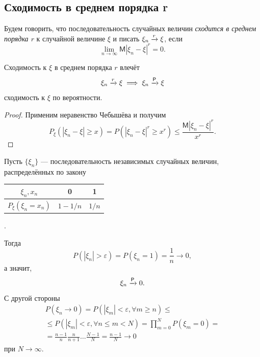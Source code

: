 \subsection{Сходимость в среднем порядка r}
\begin{definition}
	Будем говорить, что последовательность случайных величин \emph{сходится в
	среднем порядка $ r $} к случайной величине $ \xi $ и писать $ \xi_n \xrightarrow[]{r} \xi
	$, если  
	\[
	\lim_{n\to\infty}\mathsf M |\xi_n - \xi|^r = 0.
	\]
	
\end{definition}

\begin{utv}
	Сходимость к $ \xi $ в среднем порядка $ r $ влечёт
	\[
		\xi_n\xrightarrow[]{r}\xi \implies \xi_n \xrightarrow[]{\mathsf P} \xi
	\]
	сходимость к $ \xi $ по вероятности.
\end{utv}
\begin{proof}
	Применим неравенство Чебышёва и получим 
	\[
			P_\xi(|\xi_n - \xi| \geqslant x) = P (|\xi_n - \xi|^r \geqslant x^r )
			\leqslant \frac{\mathsf M |\xi_n - \xi|^r}{x^r}.
	\]
\end{proof}

\begin{ex}[факультативно]
	Пусть $ \{\xi_n\} $ --- последовательность независимых случайных величин,
	распределённых по закону
  
	{\centering
	\begin{tabular}{|c|c|c|}
		\hline
		$ \xi_n , x_n $ &0 &1 \\\hline
		$ P_\xi(\xi_n = x_n) $ & $ 1 - 1/n $ & $ 1/n $\\\hline
\end{tabular}.}

Тогда  
\[
		P(|\xi_n| > \varepsilon) = P(\xi_n = 1) = \frac{1}{n} \to 0,
\]
а значит, 
\[
		\xi_n \xrightarrow[]{\mathsf P} 0.
\]
С другой стороны
\begin{multline*}
	P(\xi_n \to 0) = P(|\xi_m| < \varepsilon, \forall m \geqslant n) \leqslant \\
	\leqslant P(|\xi_m| < \varepsilon, \forall n \leqslant m < N) = \prod_{m=0}^N
	P(\xi_m = 0) = \\
	= \frac{n-1}{n}\frac{n}{n+1}\ldots
	\frac{N-1}{N} = \frac{n-1}{N} \to 0
\end{multline*}
при $ N \to \infty $.
\end{ex}



